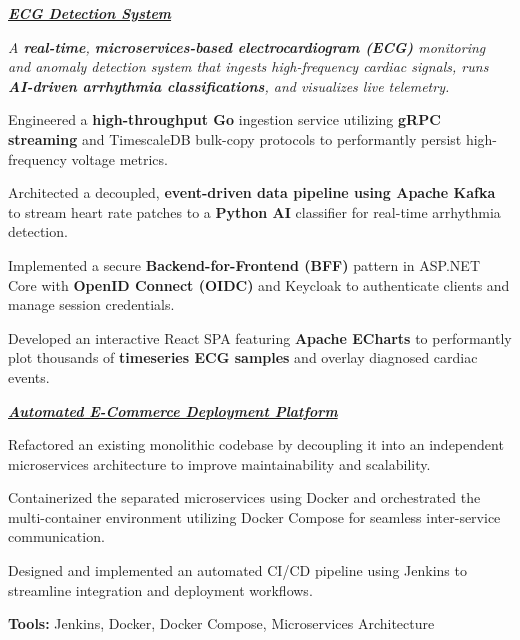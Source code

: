 \vspace{0.5 cm}

\textit{\href{https://github.com/ahmniab/ecg-detection-system}{\textcolor{linkColor}{\textbf{ECG Detection System }}}}

\vspace{0.10 cm}
\begin{onecolentry}
    \textit{A \textbf{real-time}, \textbf{microservices-based electrocardiogram (ECG)} monitoring and anomaly detection system that ingests high-frequency cardiac signals, runs \textbf{AI-driven arrhythmia classifications}, and visualizes live telemetry.}
    \begin{highlights}
        \item Engineered a \textbf{high-throughput Go} ingestion service utilizing \textbf{gRPC streaming} and TimescaleDB bulk-copy protocols to performantly persist high-frequency voltage metrics.
        \item Architected a decoupled, \textbf{event-driven data pipeline using Apache Kafka} to stream heart rate patches to a \textbf{Python AI} classifier for real-time arrhythmia detection.
        \item Implemented a secure \textbf{Backend-for-Frontend (BFF)} pattern in ASP.NET Core with \textbf{OpenID Connect (OIDC)} and Keycloak to authenticate clients and manage session credentials.
        \item Developed an interactive React SPA featuring \textbf{Apache ECharts} to performantly plot thousands of \textbf{timeseries ECG samples} and overlay diagnosed cardiac events.
    \end{highlights}
\end{onecolentry}
\vspace{0.5 cm}

\textit{\href{https://github.com/ahmniab/Automated-E-Commerce-Deployment-Platform}{\textcolor{linkColor}{\textbf{Automated E-Commerce Deployment Platform }}}}

\vspace{0.10 cm}
\begin{onecolentry}
    \begin{highlights}
        \item Refactored an existing monolithic codebase by decoupling it into an independent microservices architecture to improve maintainability and scalability.
        \item Containerized the separated microservices using Docker and orchestrated the multi-container environment utilizing Docker Compose for seamless inter-service communication.
        \item Designed and implemented an automated CI/CD pipeline using Jenkins to streamline integration and deployment workflows.
        \item \textbf{Tools:} Jenkins, Docker, Docker Compose, Microservices Architecture
    \end{highlights}
\end{onecolentry}
\vspace{0.5 cm}


